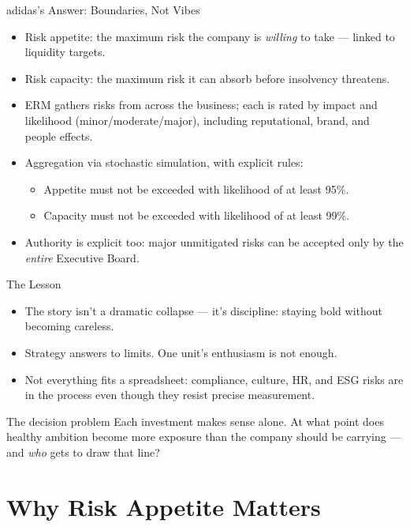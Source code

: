 \documentclass[11pt, aspectratio=169]{beamer}
\begin{document}
\begin{frame}{adidas's Answer: Boundaries, Not Vibes}
\begin{itemize}
  \item \alert{Risk appetite}: the maximum risk the company is \emph{willing} to take --- linked to liquidity targets.
  \item \alert{Risk capacity}: the maximum risk it can absorb before insolvency threatens.
  \item ERM gathers risks from across the business; each is rated by impact and likelihood (minor/moderate/major), including reputational, brand, and people effects.
  \item Aggregation via \alert{stochastic simulation}, with explicit rules:
  \begin{itemize}
    \item Appetite must not be exceeded with likelihood of at least \alert{95\%}.
    \item Capacity must not be exceeded with likelihood of at least \alert{99\%}.
  \end{itemize}
  \item Authority is explicit too: major unmitigated risks can be accepted only by the \emph{entire} Executive Board.
\end{itemize}
\end{frame}

\begin{frame}{The Lesson}
\begin{itemize}
  \item The story isn't a dramatic collapse --- it's discipline: staying bold without becoming careless.
  \item Strategy answers to limits. One unit's enthusiasm is not enough.
  \item Not everything fits a spreadsheet: compliance, culture, HR, and ESG risks are in the process even though they resist precise measurement.
\end{itemize}
\medskip
\begin{block}{The decision problem}
Each investment makes sense alone. At what point does healthy ambition become more exposure than the company should be carrying --- and \emph{who} gets to draw that line?
\end{block}
\end{frame}

\section{Why Risk Appetite Matters}
\end{document}
